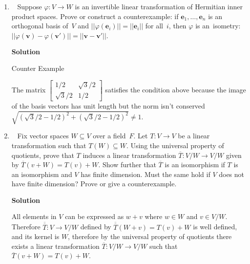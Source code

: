 \documentclass[11pt]{article}
\newcommand\score[1]{\marginpar{\vspace{-2ex}\color{blue}{#1/14}}\hspace{-1ex}}
\newcommand\0{\mathbf{0}}
\newcommand\ee{\mathbf{e}}
\newcommand\vv{\mathbf{v}}
\newcommand\<{\langle}
\renewcommand\>{\rangle}
\def\ol#1{{\overline {#1}}}
\begin{document}
\begin{enumerate}
Since the kernel of $A-\lambda I$ is 2, then there are 2 jordan blocks(All jordan blocks have size atleast 1). Since the kernel of
$(A-\lambda I)^2$ is 3, then only 1 jordan block has size $> 1$ because if both had 
size $> 1$, then the dimension kernel would increase by 2. So now we have that there are 
2 jordan blocks, one of size 1 and one of size at least 2. Since the sum the sizes of all 
jordan blocks must sum upto 5, then the size of the second jordan block must be 4. 

We hit the contradiction because the kernel of $(A-\lambda I)^3$ is 5. The increase in the dimension of the kernel is 2
but we already know that there is only one jordan block that is contributing additional dimensions to 
the kernel, and it can't contribute more than 1 dimension to the kernel, therefore no such matrix exists
(A matrix can't have 2 jordan blocks of size atleast 3 and 1 of size atleast 2).

\pagebreak
\item\ \score{}%
Suppose $\varphi: V \to W$ is an invertible linear transformation of
Hermitian inner product spaces.  Prove or construct a counterexample:
if $\ee_1,\ldots,\ee_n$ is an orthogonal basis of~$V$ and
$||\varphi(\ee_i)|| = ||\ee_i||$ for all~$i$, then $\varphi$ is
an~isometry: $||\varphi(\vv) - \varphi(\vv')|| = ||\vv - \vv'||$.

\textbf{Solution}

Counter Example

The matrix $\begin{bmatrix} 1/2 & \sqrt3/2 \\ \sqrt3/2 & 1/2 \end{bmatrix}$ satisfies  the condition above because
the image of the basis vectors has unit length but the norm isn't conserved $\sqrt{(\sqrt3/2 - 1/2)^2 + (\sqrt3/2 - 1/2)^2} \neq 1$.
\pagebreak

\item\ \score{}%
Fix vector spaces $W \subseteq V$ over a field~$F$.  Let $T: V \to V$
be a linear transformation such that $T(W) \subseteq W$.  Using the
universal property of quotients, prove that $T$ induces a linear
transformation $\ol T: V/W \to V/W$ given by $\ol T(v + W) = T(v) + W$.
Show further that $\ol T$ is an isomorphism if $T$ is an isomorphism
and $V$ has finite dimension.  Must the same hold if $V$ does not have
finite dimension?  Prove or give a counterexample.


\textbf{Solution}

All elements in $V$ can be expressed as $w + v$ where $w \in W$ and $v \in V/W$. Therefore
$\overline{\overline T} : V \rightarrow V/W$ defined by
$\overline{\overline T}(W+v) = T(v) + W$ is well defined, and its kernel is $W$, therefore by 
the universal property of quotients there exists a linear transformation ${\overline T}: V/W \rightarrow V/W$ such that
$\overline{T} (v + W) = T(v) + W$.


\end{enumerate}
\end{document}
